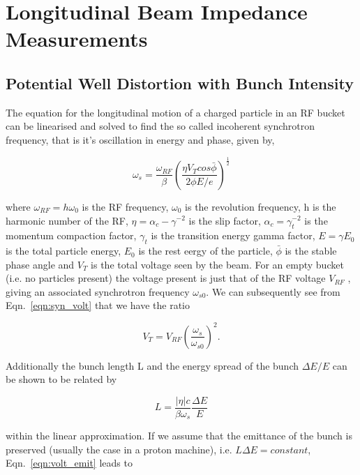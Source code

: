 \section{Longitudinal Beam Impedance Measurements}


\subsection{Potential Well Distortion with Bunch Intensity}
\label{sec:pot-well-dist}

The equation for the longitudinal motion of a charged particle in an RF bucket can be linearised and solved to find the so called incoherent synchrotron frequency, that is it's oscillation in energy and phase, given by,

\begin{equation}
\omega_{s} = \frac{\omega_{RF}}{\beta} \left( \frac{\eta V_{T}cos\bar{\phi}}{2\phi E/e}  \right)^{\frac{1}{2}}
\label{eqn:syn_volt}
\end{equation}

where $\omega_{RF} = h\omega_{0}$ is the RF frequency, $\omega_{0}$ is the revolution frequency, h is the harmonic
number of the RF, $\eta = \alpha_{c} - \gamma^{-2}$ is the slip factor, $\alpha_{c} = \gamma_{t}^{-2}$ is the momentum compaction factor, $\gamma_{t}$ is the transition energy gamma factor, $E=\gamma E_{0}$ is the total particle energy, $E_{0}$ is the rest eergy of the particle, $\bar{\phi}$ is the stable phase angle and $V_{T}$ is the total voltage seen by the beam. For an empty bucket (i.e. no particles present) the voltage present is just that of the RF voltage $V_{RF}$ , giving an associated synchrotron frequency $\omega_{s0}$. We can subsequently see from Eqn.~\ref{eqn:syn_volt} that we have the ratio

\begin{equation}
V_{T} = V_{RF}\left(  \frac{\omega_{s}}{\omega_{s0}} \right)^{2}.
\label{eqn:volt_emit}
\end{equation}

Additionally the bunch length L and the energy spread of the bunch $\Delta E/E$ can be shown to be related by

\begin{equation}
L = \frac{\left| \eta \right|c}{\beta\omega_{s}}\frac{\Delta E}{E}
\end{equation}

within the linear approximation. If we assume that the emittance of the bunch is preserved (usually the case in a proton machine), i.e. $L\Delta E = constant$, Eqn.~\ref{eqn:volt_emit} leads to

